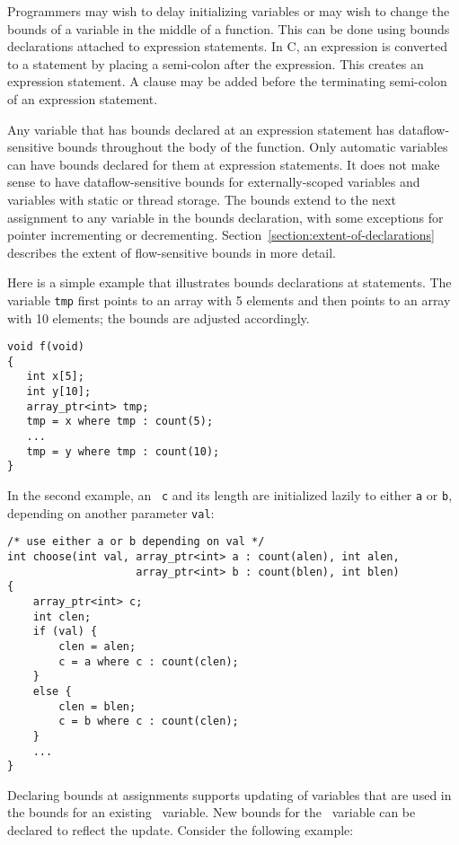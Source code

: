 Programmers may wish to delay initializing variables or may wish to
change the bounds of a variable in the middle of a function. This can be
done using bounds declarations attached to expression statements. In C,
an expression is converted to a statement by placing a semi-colon after
the expression. This creates an expression statement. A 
clause may be added before the terminating semi-colon of an expression
statement.

Any variable that has bounds declared at an expression statement has
dataflow-sensitive bounds throughout the body of the function. Only
automatic variables can have bounds declared for them at expression
statements. It does not make sense to have dataflow-sensitive bounds for
externally-scoped variables and variables with static or thread storage.
The bounds extend to the next assignment to any variable in the bounds
declaration, with some exceptions for pointer incrementing or
decrementing. Section~\ref{section:extent-of-declarations} 
describes the extent of flow-sensitive bounds
in more detail.

Here is a simple example that illustrates bounds declarations at
statements. The variable \texttt{tmp} first points to an array with 5
elements and then points to an array with 10 elements; the bounds are
adjusted accordingly.

\begin{verbatim}
void f(void) 
{
   int x[5];
   int y[10];
   array_ptr<int> tmp;
   tmp = x where tmp : count(5);
   ...
   tmp = y where tmp : count(10);
}
\end{verbatim}

In the second example, an \arrayptr\ \texttt{c} and its length are initialized
lazily to either \texttt{a} or \texttt{b}, depending on another parameter \texttt{val}:

\begin{verbatim}
/* use either a or b depending on val */
int choose(int val, array_ptr<int> a : count(alen), int alen,
                    array_ptr<int> b : count(blen), int blen) 
{
    array_ptr<int> c;
    int clen;
    if (val) {
        clen = alen;
        c = a where c : count(clen);
    }
    else {
        clen = blen;
        c = b where c : count(clen);
    }    
    ...
}
\end{verbatim}

Declaring bounds at assignments supports updating of variables that are
used in the bounds for an existing \arrayptr\ variable. New
bounds for the \arrayptr\ variable can be declared to reflect
the update. Consider the following example:

